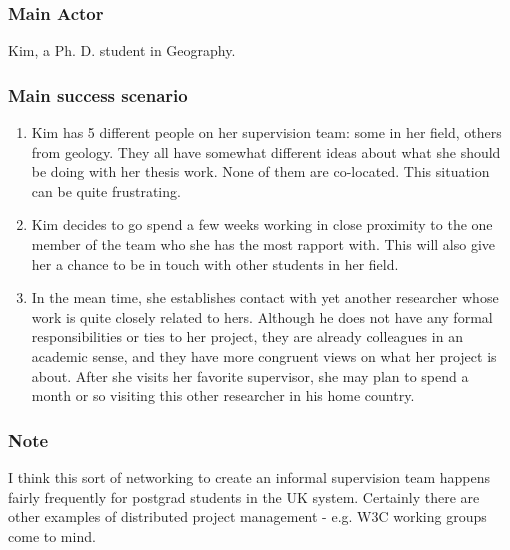 \subsubsection{Main Actor}

Kim, a Ph. D. student in Geography.

\subsubsection{Main success scenario}

\begin{enumerate}
\item
  Kim has 5 different people on her supervision team: some in her field,
  others from geology. They all have somewhat different ideas about what
  she should be doing with her thesis work. None of them are co-located.
  This situation can be quite frustrating.
\item
  Kim decides to go spend a few weeks working in close proximity to the
  one member of the team who she has the most rapport with. This will
  also give her a chance to be in touch with other students in her
  field.
\item
  In the mean time, she establishes contact with yet another researcher
  whose work is quite closely related to hers. Although he does not have
  any formal responsibilities or ties to her project, they are already
  colleagues in an academic sense, and they have more congruent views on
  what her project is about. After she visits her favorite supervisor,
  she may plan to spend a month or so visiting this other researcher in
  his home country.
\end{enumerate}
\subsubsection{Note}

I think this sort of networking to create an informal supervision team
happens fairly frequently for postgrad students in the UK system.
Certainly there are other examples of distributed project management -
e.g. W3C working groups come to mind.
